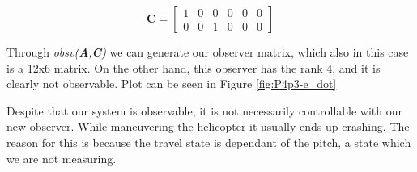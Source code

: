 \begin{equation*}
  \bm{C} =
  \begin{bmatrix}
    1 & 0 & 0 & 0 & 0 & 0 \\
    0 & 0 & 1 & 0 & 0 & 0
  \end{bmatrix}
\end{equation*}

Through \textit{obsv(\textbf{A},\textbf{C})} we can generate our observer matrix, which also in this case is a 12x6 matrix. On the other hand, this observer has the rank 4, and it is clearly not observable. Plot can be seen in Figure \ref{fig:P4p3-e_dot} \newline

Despite that our system is observable, it is not necessarily controllable with our new observer. While maneuvering the helicopter it usually ends up crashing. The reason for this is because the travel state is dependant of the pitch, a state which we are not measuring. 